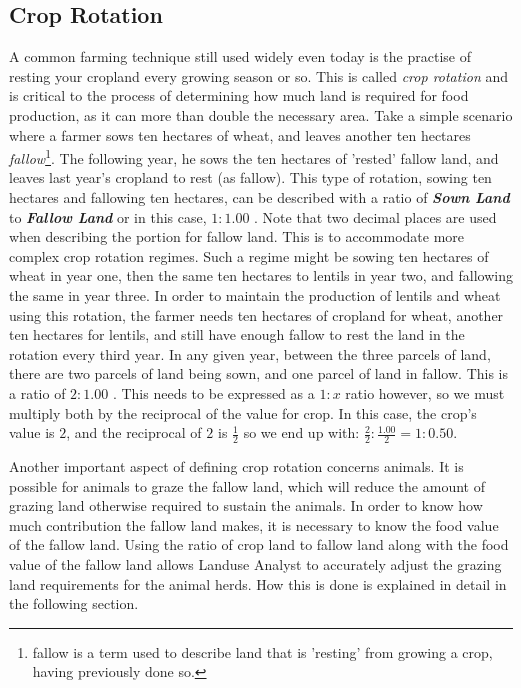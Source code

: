     \subsection{Crop Rotation}
    \label{cropRotation}
    A common farming technique still used widely even today is the practise of
resting your cropland every growing season or so.  This is called \textit{crop
rotation} and is critical to the process of determining how much land is
required for food production, as it can more than double the necessary area. 
Take a simple scenario where a farmer sows ten hectares of wheat, and leaves
another ten hectares \textit{fallow}\footnote{fallow is a term used to describe
land that is 'resting' from growing a crop, having previously done so.}.  The
following year, he sows the ten hectares of 'rested' fallow land, and leaves
last year's cropland to rest (as fallow).  This type of rotation, sowing ten
hectares and fallowing ten hectares, can be described with a ratio of
\textbf{\textit{Sown Land}} to \textbf{\textit{Fallow Land}} or in this case,
$1:1.00$ .  Note that two decimal places are used when describing the portion
for fallow land.  This is to accommodate more complex crop rotation regimes. 
Such a regime might be sowing ten hectares of wheat in year one, then the same
ten hectares to lentils in year two, and fallowing the same in year three.  In
order to maintain the production of lentils and wheat using this rotation, the
farmer needs ten hectares of cropland for wheat, another ten hectares for
lentils, and still have enough fallow to rest the land in the rotation every
third year.  In any given year, between the three parcels of land, there are two
parcels of land being sown, and one parcel of land in fallow.  This is a ratio
of $2:1.00$ .  This needs to be expressed as a $1:x$ ratio however, so we must
multiply both by the reciprocal of the value for crop.  In this case, the crop's
value is $2$, and the reciprocal of $2$ is $\frac{1}{2}$ so we end up with:
$\frac{2}{2}:\frac{1.00}{2} = 1:0.50$.

    Another important aspect of defining crop rotation concerns animals.  It is
possible for animals to graze the fallow land, which will reduce the amount of
grazing land otherwise required to sustain the animals.  In order to know how
much contribution the fallow land makes, it is necessary to know the food value
of the fallow land.  Using the ratio of crop land to fallow land along with the
food value of the fallow land allows Landuse Analyst to accurately adjust the
grazing land requirements for the animal herds.  How this is done is explained
in detail in the following section.

